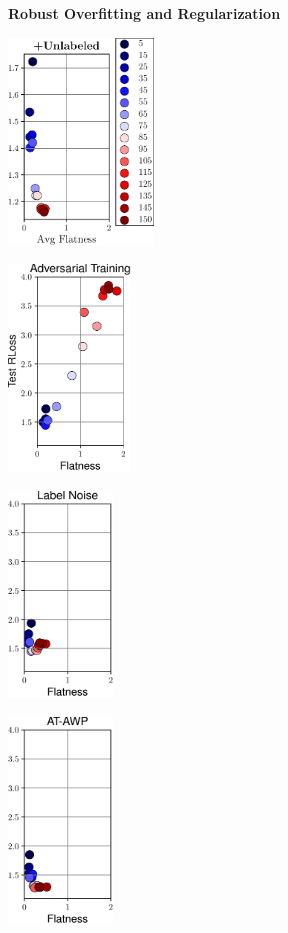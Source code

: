 \documentclass[64pt,aspectratio=169]{beamer}
\begin{document}
	\begin{frame}[t]{\bfseries Robust Overfitting and Regularization}
		\Large
		\centering
		\begin{minipage}[t]{0.075\textwidth}
			\includegraphics[height=5.5cm,clip,trim={5cm 0cm 0cm 0cm}]{../paper/plots_main_flatness_epochs_correlation_seq_500k}
		\end{minipage}
		\begin{minipage}[t]{0.225\textwidth}
			\includegraphics[height=5.5cm]{plots/talk_flatness_epochs_correlation_seq.pdf}
		\end{minipage}
		\begin{minipage}[t]{0.2\textwidth}
			\includegraphics[height=5.5cm]{plots/talk_flatness_epochs_correlation_seq_ln.pdf}
		\end{minipage}
		\begin{minipage}[t]{0.2\textwidth}
			\includegraphics[height=5.5cm]{plots/talk_flatness_epochs_correlation_seq_awp.pdf}

\end{minipage}
\end{frame}
\end{document}
